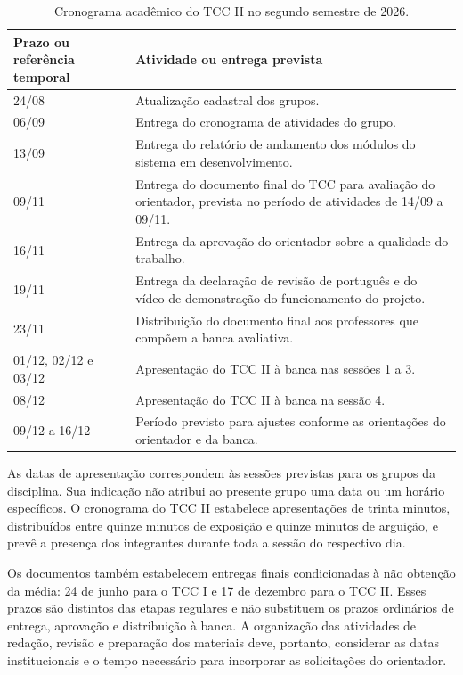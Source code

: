 \begin{table}[htbp]
\centering
\caption{Cronograma acadêmico do TCC II no segundo semestre de 2026.}
\label{tab:4-cronograma-academico-ii}
\small
\begin{tabularx}{\textwidth}{|p{}|X|}
\hline
\textbf{Prazo ou referência temporal} & \textbf{Atividade ou entrega prevista} \\ \hline
24/08 & Atualização cadastral dos grupos. \\ \hline
06/09 & Entrega do cronograma de atividades do grupo. \\ \hline
13/09 & Entrega do relatório de andamento dos módulos do sistema em desenvolvimento. \\ \hline
09/11 & Entrega do documento final do TCC para avaliação do orientador, prevista no período de atividades de 14/09 a 09/11. \\ \hline
16/11 & Entrega da aprovação do orientador sobre a qualidade do trabalho. \\ \hline
19/11 & Entrega da declaração de revisão de português e do vídeo de demonstração do funcionamento do projeto. \\ \hline
23/11 & Distribuição do documento final aos professores que compõem a banca avaliativa. \\ \hline
01/12, 02/12 e 03/12 & Apresentação do TCC II à banca nas sessões 1 a 3. \\ \hline
08/12 & Apresentação do TCC II à banca na sessão 4. \\ \hline
09/12 a 16/12 & Período previsto para ajustes conforme as orientações do orientador e da banca. \\ \hline
\end{tabularx}
\par{}
\end{table}

As datas de apresentação correspondem às sessões previstas para os grupos da disciplina. Sua indicação não atribui ao presente grupo uma data ou um horário específicos. O cronograma do TCC II estabelece apresentações de trinta minutos, distribuídos entre quinze minutos de exposição e quinze minutos de arguição, e prevê a presença dos integrantes durante toda a sessão do respectivo dia.

Os documentos também estabelecem entregas finais condicionadas à não obtenção da média: 24 de junho para o TCC I e 17 de dezembro para o TCC II. Esses prazos são distintos das etapas regulares e não substituem os prazos ordinários de entrega, aprovação e distribuição à banca. A organização das atividades de redação, revisão e preparação dos materiais deve, portanto, considerar as datas institucionais e o tempo necessário para incorporar as solicitações do orientador.

